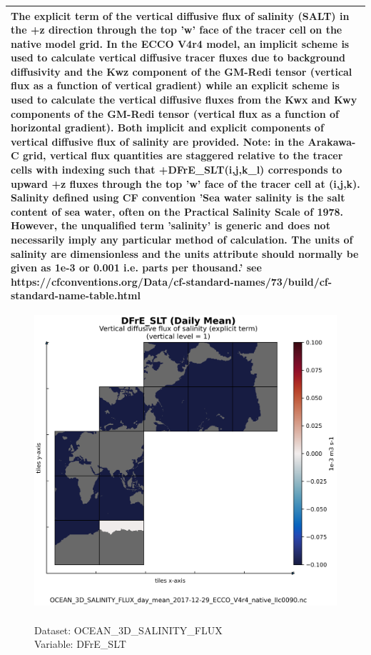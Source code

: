 \begin{longtable}{|p{}|p{}|p{}|p{}|}
\multicolumn{4}{|p{1\textwidth}|}{The explicit term of the vertical diffusive flux of salinity (SALT) in the +z direction through the top 'w' face of the tracer cell on the native model grid. In the ECCO V4r4 model, an implicit scheme is used to calculate vertical diffusive tracer fluxes due to background diffusivity and the Kwz component of the GM-Redi tensor (vertical flux as a function of vertical gradient) while an explicit scheme is used to calculate the vertical diffusive fluxes from the Kwx and Kwy components of the GM-Redi tensor (vertical flux as a function of horizontal gradient). Both implicit and explicit components of vertical diffusive flux of salinity are provided. Note: in the Arakawa-C grid, vertical flux quantities are staggered relative to the tracer cells with indexing such that +DFrE\_SLT(i,j,k\_l) corresponds to upward +z fluxes through the top 'w' face of the tracer cell at (i,j,k). Salinity defined using CF convention 'Sea water salinity is the salt content of sea water, often on the Practical Salinity Scale of 1978. However, the unqualified term 'salinity' is generic and does not necessarily imply any particular method of calculation. The units of salinity are dimensionless and the units attribute should normally be given as 1e-3 or 0.001 i.e. parts per thousand.' see https://cfconventions.org/Data/cf-standard-names/73/build/cf-standard-name-table.html} \\ \hline
\end{longtable}

\begin{figure}[H]
\centering
\includegraphics[scale=0.5]{../images/plots/native_plots/Ocean_Three-Dimensional_Salinity_Fluxes/DFrE_SLT.png}
\caption{\\Dataset: OCEAN\_3D\_SALINITY\_FLUX\\Variable: DFrE\_SLT}
\label{tab:table-OCEAN_3D_SALINITY_FLUX_DFrE_SLT-Plot}
\end{figure}
\pagebreak
